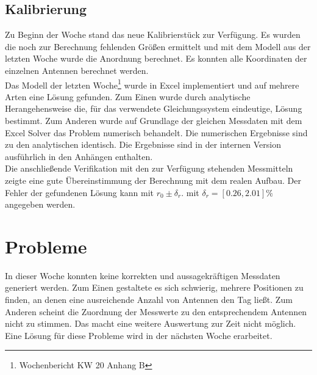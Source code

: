 \documentclass[a4paper,12pt,fleqn]{article}
\begin{document}
\subsection{Kalibrierung}
%
Zu Beginn der Woche stand das neue Kalibrierstück zur Verfügung. Es wurden die noch zur Berechnung fehlenden Größen ermittelt und mit dem Modell aus der letzten Woche wurde die Anordnung berechnet. Es konnten alle Koordinaten der einzelnen Antennen berechnet werden.\\
%
Das Modell der letzten Woche\footnote{Wochenbericht KW 20 Anhang B} wurde in Excel implementiert und auf mehrere Arten eine Lösung gefunden. Zum Einen wurde durch analytische Herangehensweise die, für das verwendete Gleichungssystem eindeutige, Lösung bestimmt. Zum Anderen wurde auf Grundlage der gleichen Messdaten mit dem Excel Solver das Problem numerisch behandelt. Die numerischen Ergebnisse sind zu den analytischen identisch. Die Ergebnisse sind in der internen Version ausführlich in den Anhängen enthalten.\\
%
Die anschließende Verifikation mit den zur Verfügung stehenden Messmitteln zeigte eine gute Übereinstimmung der Berechnung mit dem realen Aufbau. Der Fehler der gefundenen Lösung kann mit $r_0\pm\delta_r.$ mit $\delta_r=[0.26,2.01]\%$ angegeben werden.

\section{Probleme}
\label{sec:Problems}
In dieser Woche konnten keine korrekten und aussagekräftigen Messdaten generiert werden. Zum Einen gestaltete es sich schwierig, mehrere Positionen zu finden, an denen eine ausreichende Anzahl von Antennen den Tag ließt. Zum Anderen scheint die Zuordnung der Messwerte zu den entsprechendem Antennen nicht zu stimmen. Das macht eine weitere Auswertung zur Zeit nicht möglich. Eine Lösung für diese Probleme wird in der nächsten Woche erarbeitet.



\newpage


\end{document}
